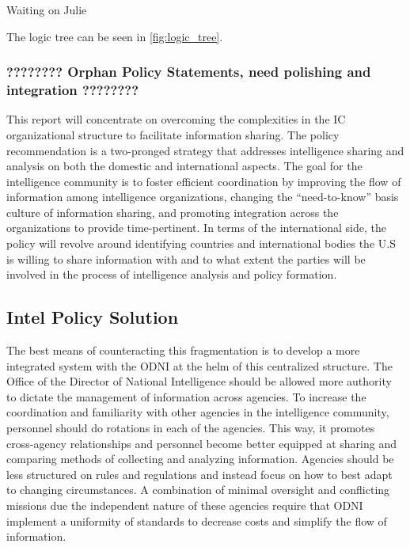 \documentclass{report}
\begin{document}
Waiting on Julie

The logic tree can be seen in \autoref{fig:logic_tree}.




\subsubsection{????????  Orphan Policy Statements, need polishing and integration ????????}

This report will concentrate on overcoming the complexities in the IC organizational structure to facilitate information sharing. The policy recommendation is a two-pronged strategy that addresses intelligence sharing and analysis on both the domestic and international aspects. The goal for the intelligence community is to foster efficient coordination by improving the flow of information among intelligence organizations, changing the \enquote{need-to-know} basis culture of information sharing, and promoting integration across the organizations to provide time-pertinent. In terms of the international side, the policy will revolve around identifying countries and international bodies the U.S is willing to share information with and to what extent the parties will be involved in the process of intelligence analysis and policy formation.

\subsection{Intel Policy Solution}

The best means of counteracting this fragmentation is to develop a more integrated system with the ODNI at the helm of this  centralized structure. The Office of the Director of National Intelligence should be allowed more authority to dictate the management of information across agencies.  To increase the coordination and familiarity with other agencies in the intelligence community, personnel should do rotations in each of the agencies. This way, it promotes cross-agency relationships and personnel become better equipped at sharing and comparing methods of collecting and analyzing information.  Agencies should be less structured on rules and regulations and instead focus on how to best adapt to changing circumstances. A combination of minimal oversight and conflicting missions due the independent nature of these agencies \cite{Zegart2005} require that ODNI implement a uniformity of standards to decrease costs and simplify the flow of information. 
\end{document}
